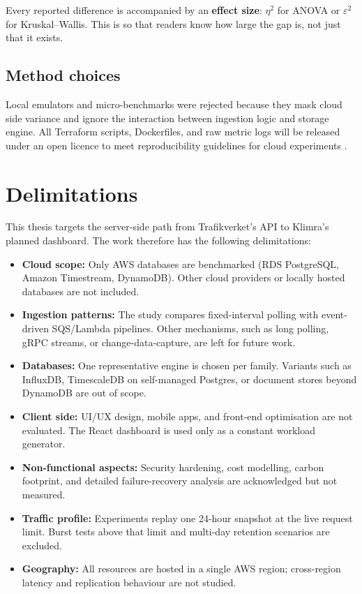 \documentclass[nomenclature, english, biblatex]{kththesis}
\numberwithin{listing}{chapter}
\begin{document}
\noindent
Every reported difference is accompanied by an \textbf{effect size}: $\eta^{2}$ for ANOVA or $\varepsilon^{2}$ for Kruskal–Wallis. This is so that readers know how large the gap is, not just that it exists.


\subsection{Method choices}
Local emulators and micro-benchmarks were rejected because they mask cloud side variance and ignore the interaction between ingestion logic and storage engine. All Terraform scripts, Dockerfiles, and raw metric logs will be released under an open licence to meet reproducibility guidelines for cloud experiments \cite{PerformanceEvaluationMetrics}.






\section{Delimitations}
\label{sec:delimitations}
This thesis targets the server-side path from Trafikverket's \gls{API} to Klimra's planned dashboard. The work therefore has the following delimitations:

\begin{itemize}[noitemsep,leftmargin=*]
 \item \textbf{Cloud scope:} Only \gls{AWS} databases are benchmarked (RDS PostgreSQL, Amazon Timestream, DynamoDB). Other cloud providers or locally hosted databases are not included.

 \item \textbf{Ingestion patterns:} The study compares fixed-interval polling with event-driven SQS/Lambda pipelines. Other mechanisms, such as long polling, gRPC streams, or change-data-capture, are left for future work.

 \item \textbf{Databases:} One representative engine is chosen per family. Variants such as InfluxDB, TimescaleDB on self-managed Postgres, or document stores beyond DynamoDB are out of scope.

 \item \textbf{Client side:} UI/UX design, mobile apps, and front-end optimisation are not evaluated. The React dashboard is used only as a constant workload generator.

 \item \textbf{Non-functional aspects:} Security hardening, cost modelling, carbon footprint, and detailed failure-recovery analysis are acknowledged but not measured.

 \item \textbf{Traffic profile:} Experiments replay one 24-hour snapshot at the live request limit. Burst tests above that limit and multi-day retention scenarios are excluded.

 \item \textbf{Geography:} All resources are hosted in a single \gls{AWS} region; cross-region latency and replication behaviour are not studied.
\end{itemize}
\end{document}
